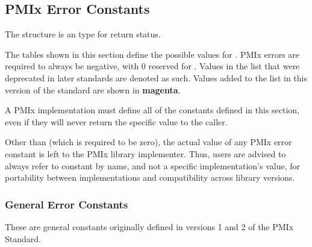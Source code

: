 \subsection{PMIx Error Constants}
\label{api:struct:errors}

The  structure is an  type for return status.

The tables shown in this section define the possible values for .
PMIx errors are required to always be negative, with 0 reserved for . Values in the list that were deprecated in later standards are denoted as such. Values added to the list in this version of the standard are shown in \textbf{\color{magenta}magenta}.

\adviceimplstart
A PMIx implementation must define all of the constants defined in this section, even if they will never return the specific value to the caller.
\adviceimplend

\adviceuserstart
Other than  (which is required to be zero), the actual value of any \ac{PMIx} error constant is left to the \ac{PMIx} library implementer. Thus, users are advised to always refer to constant by name, and not a specific implementation's value, for portability between implementations and compatibility across library versions.
\adviceuserend

\subsubsection{General Error Constants}

These are general constants originally defined in versions 1 and 2 of the PMIx Standard.


